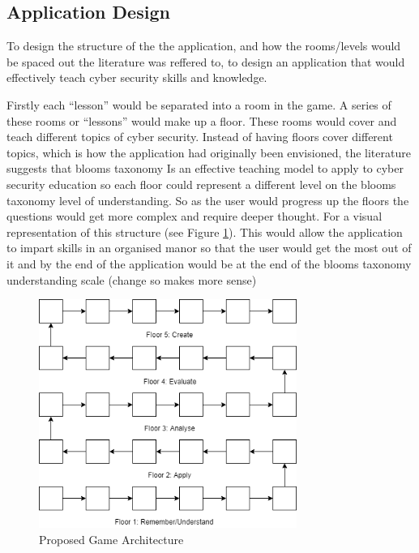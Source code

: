 \documentclass[12pt,a4paper]{article}
\begin{document}
\subsection{Application Design}  
To design the structure of the the application, and how the rooms/levels would be spaced out the literature was reffered to, to design an application that would effectively teach cyber security skills and knowledge. 

Firstly each “lesson” would be separated into a room in the game. A series of these rooms or “lessons” would make up a floor. These rooms would cover and teach different topics of cyber security. Instead of having floors cover different topics, which is how the application had originally been envisioned, the literature suggests that blooms taxonomy Is an effective teaching model to apply to cyber security education so each floor could represent a different level on the blooms taxonomy level of understanding. So as the user would progress up the floors the questions would get more complex and require deeper thought. For a visual representation of this structure (see Figure \ref{gamearch}).  This would allow the application to impart skills in an organised manor so that the user would get the most out of it and by the end of the application would be at the end of the blooms taxonomy understanding scale (change so makes more sense)

\begin{figure}[h]
    \centering
    \includegraphics[width=0.75\textwidth]{Figs/gamearch.png} 
    \caption{Proposed Game Architecture} 
    \label{gamearch}
\end{figure}
\end{document}
